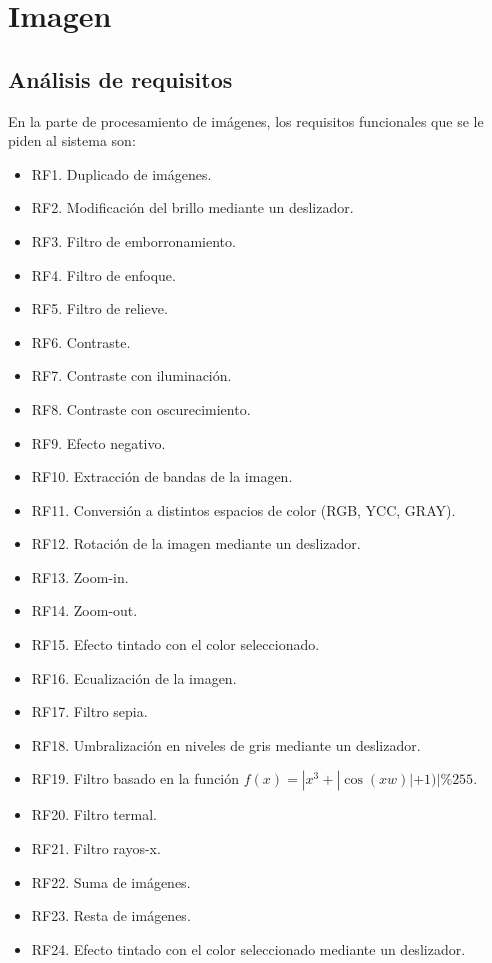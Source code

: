 \documentclass[11pt,a4paper]{article}
\begin{document}
\newpage

\section{Imagen}

\subsection{Análisis de requisitos}
En la parte de procesamiento de imágenes, los requisitos funcionales que se le piden al sistema son:

\begin{itemize}
	\item RF1. Duplicado de imágenes.
	\item RF2. Modificación del brillo mediante un deslizador.
	\item RF3. Filtro de emborronamiento.
	\item RF4. Filtro de enfoque.
	\item RF5. Filtro de relieve.
	\item RF6. Contraste.
	\item RF7. Contraste con iluminación.
	\item RF8. Contraste con oscurecimiento.
	\item RF9. Efecto negativo.
	\item RF10. Extracción de bandas de la imagen.
	\item RF11. Conversión a distintos espacios de color (RGB, YCC, GRAY).
	\item RF12. Rotación de la imagen mediante un deslizador.
	\item RF13. Zoom-in.
	\item RF14. Zoom-out.
	\item RF15. Efecto tintado con el color seleccionado.
	\item RF16. Ecualización de la imagen.
	\item RF17. Filtro sepia.
	\item RF18. Umbralización en niveles de gris mediante un deslizador.
	\item RF19. Filtro basado en la función $f(x)=|x^3+|\cos(xw)|+1)|\%255$.
	\item RF20. Filtro termal.
	\item RF21. Filtro rayos-x.
	\item RF22. Suma de imágenes.
	\item RF23. Resta de imágenes.
	\item RF24. Efecto tintado con el color seleccionado mediante un deslizador.
\end{itemize}
\end{document}
